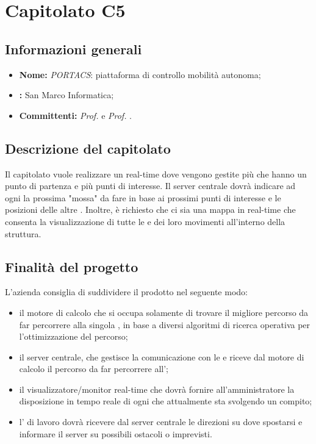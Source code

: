 \section{Capitolato C5}

\subsection{Informazioni generali}
\begin{itemize}
\item \textbf{Nome:} \textit{PORTACS}: piattaforma di controllo mobilità autonoma;
\item \textbf{:} San Marco Informatica;
\item \textbf{Committenti:} \textit{Prof. \Tullio{}} e \textit{Prof. \Riccardo{}}.
\end{itemize}

\subsection{Descrizione del capitolato}
Il capitolato vuole realizzare un  real-time dove vengono gestite più  che hanno un punto di partenza e più punti di interesse.
Il server centrale dovrà indicare ad ogni  la prossima "mossa" da fare in base ai prossimi punti di interesse e le posizioni delle altre . 
Inoltre, è richiesto che ci sia una mappa in real-time che consenta la visualizzazione di tutte le  e dei loro movimenti all'interno della struttura.

\subsection{Finalità del progetto}
L'azienda consiglia di suddividere il prodotto nel seguente modo:
\begin{itemize}
\item il motore di calcolo che si occupa solamente di trovare il migliore percorso da far percorrere alla singola , in base a diversi algoritmi di ricerca operativa per l'ottimizzazione del percorso;
\item il server centrale, che gestisce la comunicazione con le  e riceve dal motore di calcolo il percorso da far percorrere all';
\item il visualizzatore/monitor real-time che dovrà fornire all'amministratore la disposizione in tempo reale di ogni  che attualmente sta svolgendo un compito;
\item l' di lavoro dovrà ricevere dal server centrale le direzioni su dove spostarsi e informare il server su possibili ostacoli o imprevisti.
\end{itemize}

